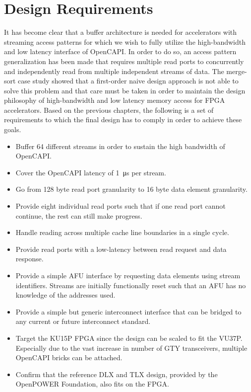 \section{Design Requirements}
\label{sec:reqs}
It has become clear that a buffer architecture is needed for accelerators with streaming access patterns for which we wish to fully utilize the high-bandwidth and low latency interface of OpenCAPI. In order to do so, an access pattern generalization has been made that requires multiple read ports to concurrently and independently read from multiple independent streams of data. The merge-sort case study showed that a first-order naive design approach is not able to solve this problem and that care must be taken in order to maintain the design philosophy of high-bandwidth and low latency memory access for FPGA accelerators. Based on the previous chapters, the following is a set of requirements to which the final design has to comply in order to achieve these goals.

\begin{itemize}
  \item{Buffer 64 different streams in order to sustain the high bandwidth of OpenCAPI.}
  \item{Cover the OpenCAPI latency of \SI{1}{\micro\second} per stream.}
  \item{Go from 128 byte read port granularity to 16 byte data element granularity.}
  \item{Provide eight individual read ports such that if one read port cannot continue, the rest can still make progress.}
  \item{Handle reading across multiple cache line boundaries in a single cycle.}
  \item{Provide read ports with a low-latency between read request and data response.}
  \item{Provide a simple AFU interface by requesting data elements using stream identifiers. Streams are initially functionally reset such that an AFU has no knowledge of the addresses used.}
  \item{Provide a simple but generic interconnect interface that can be bridged to any current or future interconnect standard.}
  \item{Target the KU15P FPGA since the design can be scaled to fit the VU37P. Especially due to the vast increase in number of GTY transceivers, multiple OpenCAPI bricks can be attached.}
  \item{Confirm that the reference DLX and TLX design, provided by the OpenPOWER Foundation, also fits on the FPGA.}
\end{itemize}

